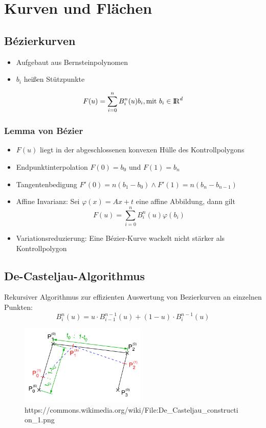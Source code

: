 \section{Kurven und Flächen}%
\label{kuf:sec:kurven_und_flaechen}

\subsection{Bézierkurven}%
\label{kuf:sub:bezierkurven}
\begin{itemize}
	\item Aufgebaut aus Bernsteinpolynomen
	\item $b_i$ heißen Stützpunkte
\end{itemize}
\vspace*{-0.5cm}
$$F(u) = \sum_{i=0}^n B_i^n(u)b_i, \text{mit } b_i \in {\rm I\!R}^d$$ 

\subsubsection{Lemma von Bézier}%
\label{kuf:sub:lemma_von_bezier}

\begin{itemize} 
	\item $F(u)$ liegt in der abgeschlossenen konvexen Hülle des Kontrollpolygons
	\item Endpunktinterpolation $F(0) = b_0$ und $F(1) = b_n$
	\item Tangentenbedigung $F'(0) = n(b_1 - b_0) \land F'(1) = n(b_n - b_{n-1})$
	\item Affine Invarianz: Sei $\varphi(x) = Ax + t$ eine affine Abbildung, dann gilt
  $$F(u) = \sum^n_{i=0} B_i^n(u) \varphi(b_i)$$
	\item Variationsreduzierung: Eine Bézier-Kurve wackelt nicht stärker als Kontrollpolygon
\end{itemize}

\subsection{De-Casteljau-Algorithmus}%
\label{kuf:sub:de_casteljau-algorithmus}

Rekursiver Algorithmus zur effizienten Auswertung von Bezierkurven an einzelnen Punkten:
$$B_i^n(u) = u \cdot B_{i-1}^{n-1} (u) + (1 - u) \cdot B_i^{n-1}(u)$$\vspace*{-0.5cm}
\begin{figure}[h]
	\centering
	\includegraphics[width=6cm]{images/De_Casteljau_construction_1}
	\caption{https://commons.wikimedia.org/wiki/File:De\_Casteljau\_construction\_1.png}
\end{figure}
\newpage
